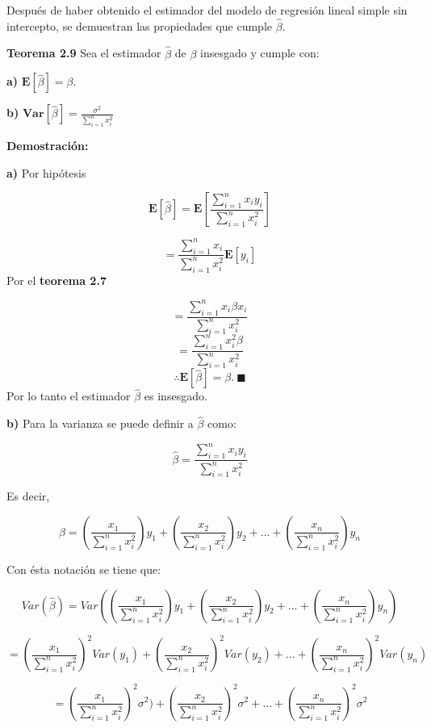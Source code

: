 \documentclass[
  a4paper,
  oneside,
  openany]{book}
\begin{document}
Después de haber obtenido el estimador del modelo de regresión lineal simple sin intercepto, se demuestran las propiedades que cumple \(\hat{\beta}.\)

\textbf{Teorema 2.9} Sea el estimador \(\hat{\beta}\) de \(\beta\) insesgado y cumple con:

\textbf{a)} \(\mathbf{E}\left[\hat{\beta}\right]=\beta.\)

\textbf{b)} \(\textbf{Var}\left[ \hat{\beta}\right]=\frac{\sigma^2}{\sum_{i=1}^{n}x_{i}^2}\)

\textbf{Demostración:}

\textbf{a)} Por hipótesis

\[\mathbf{E}\left[\hat{\beta}\right]=\mathbf{E}\left[\frac{\sum_{i=1}^{n}x_{i}y_{i}}{\sum_{i=1}^{n}x_{i}^2}\right]\]

\[=\frac{\sum_{i=1}^{n}x_{i}}{{\sum_{i=1}^{n}x_{i}^2}}\mathbf{E}[y_{i}]\]
Por el \textbf{teorema 2.7}

\[=\frac{\sum_{i=1}^{n}x_{i}\beta x_{i}}{{\sum_{i=1}^{n}x_{i}^2}}\]
\[=\frac{\sum_{i=1}^{n}x_{i}^2\beta}{{\sum_{i=1}^{n}x_{i}^2}}\]
\[\therefore \mathbf{E}\left[\hat{\beta}\right]=\beta. \ \blacksquare\]
Por lo tanto el estimador \(\hat{\beta}\) es insesgado.

\textbf{b)} Para la varianza se puede definir a \(\hat{\beta}\) como:

\[\hat{\beta}=\frac{\sum_{i=1}^{n}x_{i}y_{i}}{\sum_{i=1}^{n}x_{i}^2}\]

Es decir,

\[\hat{\beta}=\left(\frac{x_{1}}{\sum_{i=1}^{n}x_{i}^2}\right)y_{1} + \left(\frac{x_{2}}{\sum_{i=1}^{n}x_{i}^2}\right)y_{2} + \ldots + \left(\frac{x_{n}}{\sum_{i=1}^{n}x_{i}^2}\right)y_{n}\]

Con ésta notación se tiene que:

\[Var\left(\hat{\beta}\right)=Var\left( \left(\frac{x_{1}}{\sum_{i=1}^{n}x_{i}^2}\right)y_{1} + \left(\frac{x_{2}}{\sum_{i=1}^{n}x_{i}^2}\right)y_{2} + \ldots + \left(\frac{x_{n}}{\sum_{i=1}^{n}x_{i}^2}\right)y_{n} \right)\]

\[=\left(\frac{x_{1}}{\sum_{i=1}^{n}x_{i}^2}\right)^2Var(y_{1}) + \left(\frac{x_{2}}{\sum_{i=1}^{n}x_{i}^2}\right)^2Var(y_{2}) + \ldots + \left(\frac{x_{n}}{\sum_{i=1}^{n}x_{i}^2}\right)^2Var(y_{n})\]

\[=\left(\frac{x_{1}}{\sum_{i=1}^{n}x_{i}^2}\right)^2\sigma^2) + \left(\frac{x_{2}}{\sum_{i=1}^{n}x_{i}^2}\right)^2\sigma^2 + \ldots + \left(\frac{x_{n}}{\sum_{i=1}^{n}x_{i}^2}\right)^2\sigma^2\]
\end{document}
